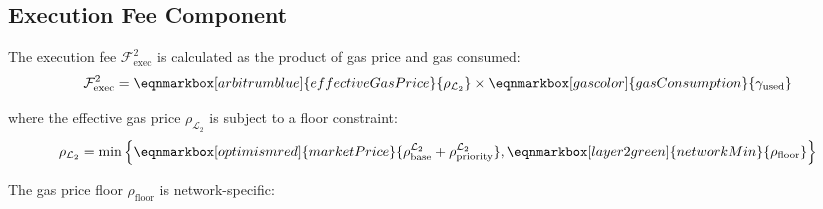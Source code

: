 \documentclass[letterpaper,10pt]{article} %
\newcommand{\layer}[1]{\mathcal{L}_{#1}}
\newcommand{\fee}[2]{\mathcal{F}_{#1}^{#2}}
\begin{document}
\newpage
\subsection{Execution Fee Component} %

The execution fee $\fee{\text{exec}}{2}$ is calculated as the product of gas price and gas consumed:
\newline
\vspace{1.5cm} %
\begin{equation}
    \label{eq:arbitrum_exec_fee}
    \fee{\text{exec}}{2} = 
    \eqnmarkbox[arbitrumblue]{effectiveGasPrice}{\rho_{\layer{2}}} \times 
    \eqnmarkbox[gascolor]{gasConsumption}{\gamma_{\text{used}}}
\end{equation}

where the effective gas price $\rho_{\layer{2}}$ is subject to a floor constraint:
\vspace{1.5cm} %
\begin{equation}
    \label{eq:arbitrum_gas_price_floor}
    \rho_{\layer{2}} = \min\left\{
    \eqnmarkbox[optimismred]{marketPrice}{\rho_{\text{base}}^{\layer{2}} + \rho_{\text{priority}}^{\layer{2}}}, 
    \eqnmarkbox[layer2green]{networkMin}{\rho_{\text{floor}}}
    \right\}
\end{equation}
\vspace{2.5cm} %
\vspace{1.5cm} %

\vspace{\baselineskip} %
The gas price floor $\rho_{\text{floor}}$ is network-specific:
\vspace{1.5cm} %
\end{document}
